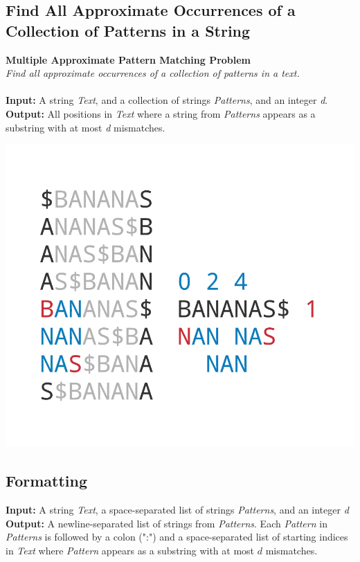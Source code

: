 \documentclass{article}
\begin{document}
\subsection{Find All Approximate Occurrences of a Collection of Patterns in a String}
\hline\vspace{5}
\noindent \textbf{Multiple Approximate Pattern Matching Problem}\\
\emph{Find all approximate occurrences of a collection of patterns in a text.}\\ \\
\textbf{Input:} A string \emph{Text}, and a collection of strings \emph{Patterns}, and an integer \emph{d}. \\
\textbf{Output:} All positions in \emph{Text} where a string from \emph{Patterns} appears as a substring with at most \emph{d} mismatches.
\begin{center}
    \includegraphics[scale=0.2]{c9/logos/9O.png} 
\end{center}
\hline\vspace{5}

\subsection*{Formatting}
\textbf{Input:} A string \emph{Text}, a space-separated list of strings \emph{Patterns}, and an integer \emph{d}\\
\noindent\textbf{Output:} A newline-separated list of strings from \emph{Patterns}. Each \emph{Pattern} in \emph{Patterns} is followed by a colon (":") and a space-separated list of starting indices in \emph{Text} where \emph{Pattern} appears as a substring with at most $d$ mismatches.
\end{document}
